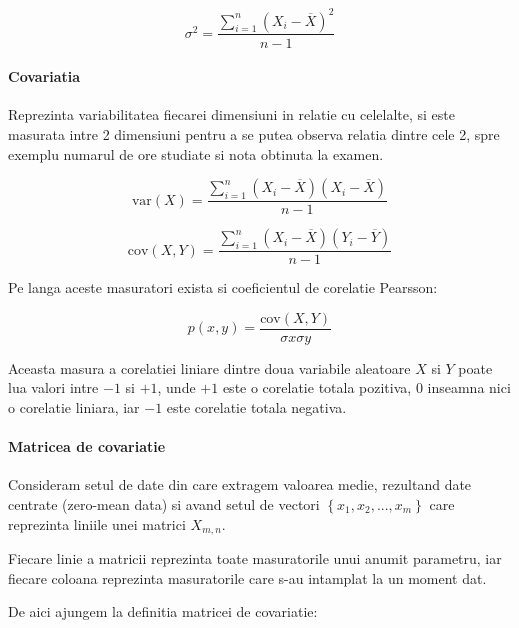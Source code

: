 \documentclass[12pt,oneside]{article}
\begin{document}
\begin{equation}
\sigma^2=\frac{\sum_{i=1}^{n} \left( X_i - \overline{X} \right)^2 }{n-1}
\end{equation}


\paragraph{Covariatia} Reprezinta variabilitatea fiecarei dimensiuni in relatie cu celelalte, si este masurata intre 2 dimensiuni pentru a se putea observa relatia dintre cele 2, spre exemplu numarul de ore studiate si nota obtinuta la examen.

\begin{equation}
\text {var} \left( X \right) = \frac{\sum_{i=1}^{n} \left( X_i - \overline{X} \right) \left( X_i - \overline{X} \right) }{n-1}
\end{equation}


\begin{equation}
\text {cov} \left( X,Y \right) = \frac{\sum_{i=1}^{n} \left( X_i - \overline{X} \right) \left( Y_i - \overline{Y} \right) }{n-1}
\end{equation}

Pe langa aceste masuratori exista si coeficientul de corelatie Pearsson:

\begin{equation}
	p(x,y)=\frac{\text{cov}(X,Y)}{\sigma x \sigma y}
\end{equation}

Aceasta masura a corelatiei liniare dintre doua variabile aleatoare $X$ si $Y$ poate lua valori intre $-1$ si $+1$, unde $+1$ este o corelatie totala pozitiva, $0$ inseamna nici o corelatie liniara, iar $-1$ este corelatie totala negativa.\cite{pearsson_correlation_coefficient_wiki}

\paragraph{Matricea de covariatie}
Consideram setul de date din care extragem valoarea medie, rezultand date centrate (zero-mean data) si avand setul de vectori \( \left\{ x_1, x_2, ..., x_m \right\} \) care reprezinta liniile unei matrici $X_{m,n}$.

Fiecare linie a matricii reprezinta toate masuratorile unui anumit parametru, iar fiecare coloana reprezinta masuratorile care s-au intamplat la un moment dat.

De aici ajungem la definitia matricei de covariatie:
\end{document}
